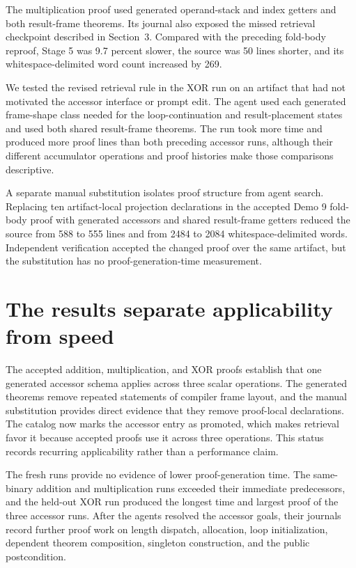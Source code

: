 \documentclass[10pt]{article}
\begin{document}
The multiplication proof used generated operand-stack and index getters and both result-frame theorems.  Its journal also exposed the missed retrieval checkpoint described in Section~3.  Compared with the preceding fold-body reproof, Stage 5 was 9.7 percent slower, the source was 50 lines shorter, and its whitespace-delimited word count increased by 269.

We tested the revised retrieval rule in the XOR run on an artifact that had not motivated the accessor interface or prompt edit.  The agent used each generated frame-shape class needed for the loop-continuation and result-placement states and used both shared result-frame theorems.  The run took more time and produced more proof lines than both preceding accessor runs, although their different accumulator operations and proof histories make those comparisons descriptive.

A separate manual substitution isolates proof structure from agent search.  Replacing ten artifact-local projection declarations in the accepted Demo 9 fold-body proof with generated accessors and shared result-frame getters reduced the source from 588 to 555 lines and from 2484 to 2084 whitespace-delimited words.  Independent verification accepted the changed proof over the same artifact, but the substitution has no proof-generation-time measurement.

\section{The results separate applicability from speed}

The accepted addition, multiplication, and XOR proofs establish that one generated accessor schema applies across three scalar operations.  The generated theorems remove repeated statements of compiler frame layout, and the manual substitution provides direct evidence that they remove proof-local declarations.  The catalog now marks the accessor entry as promoted, which makes retrieval favor it because accepted proofs use it across three operations.  This status records recurring applicability rather than a performance claim.

The fresh runs provide no evidence of lower proof-generation time.  The same-binary addition and multiplication runs exceeded their immediate predecessors, and the held-out XOR run produced the longest time and largest proof of the three accessor runs.  After the agents resolved the accessor goals, their journals record further proof work on length dispatch, allocation, loop initialization, dependent theorem composition, singleton construction, and the public postcondition.
\end{document}
